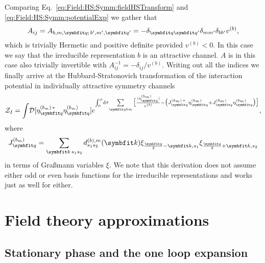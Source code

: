 Comparing Eq.~\eqref{eq:Field:HS:Symm:fieldHSTransform} and \eqref{eq:Field:HS:Symm:potentialExp} we gather that
\begin{equation}
    \label{eq:Field:HS:Symm:Matrix}
    A_{ij} = A_{b,m,\v{q};\,b',m',\v{q}'} = -\delta_{\v{q}\v{q}'}\delta_{mm'}\delta_{bb'}v^{(b)},
\end{equation}
which is trivially Hermetic and positive definite provided $v^{(b)}<0$. In this case we say that the irreducible representation $b$ is an
attractive channel. $A$ is in this case also trivially invertible with $A_{ij}^{-1} = -\delta_{ij}/v^{(b)}$.
Writing out all the indices we finally arrive at the Hubbard-Stratonovich transformation of the interaction potential in individually
attractive symmetry channels
\begin{equation}
    \label{eq:Field:HS:Symm:HSTransformedPotentialExp}
    \mathcal{Z}_I = \int\!\mathcal{D}[\eta_\v{q}^{(b_m)\,\ast}\eta_\v{q}^{(b_m)}]e^{\int_0^\beta\!\mathrm{d}\tau\!\sum\limits_{\v{q}bm}\big[\frac{|\eta_\v{q}^{(b_m)}|}{v^{(b)}} - \big(J_\v{q}^{(b_m)\,\ast}\eta_\v{q}^{(b_m)} + J_\v{q}^{(b_m)}\eta_\v{q}^{(b_m)}\big)\big]},
\end{equation}
where
\begin{equation}
    \label{eq:Field:HS:Symm:JRedef}
    J^{(b_m)}_\v{q} = \sum_{\v{k}\,s_1s_2}d_{s_1s_2}^{(b),m}(\v{k})\xi_{\frac{\v{q}}{2}-\v{k},s_1}\xi_{\frac{\v{q}}{2}+\v{k},s_2}
\end{equation}
in terms of Gra\ss mann variables $\xi$. We note that this derivation does not assume either odd or even basis functions for the
irreducible representations and works just as well for either.

\section{Field theory approximations}

\subsection{Stationary phase and the one loop expansion}

